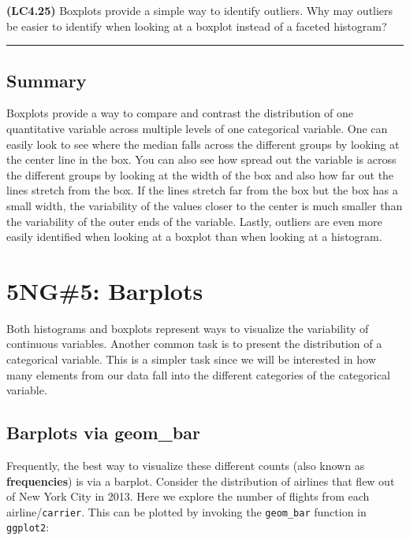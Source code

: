 \documentclass[]{tufte-book}
\let\oldrule=\rule
\renewcommand{\rule}[1]{\oldrule{\linewidth}}
\begin{document}
\textbf{(LC4.25)} Boxplots provide a simple way to identify outliers.
Why may outliers be easier to identify when looking at a boxplot instead
of a faceted histogram?

\begin{center}\rule{0.5\linewidth}{\linethickness}\end{center}

\subsection{Summary}\label{summary-3}

Boxplots provide a way to compare and contrast the distribution of one
quantitative variable across multiple levels of one categorical
variable. One can easily look to see where the median falls across the
different groups by looking at the center line in the box. You can also
see how spread out the variable is across the different groups by
looking at the width of the box and also how far out the lines stretch
from the box. If the lines stretch far from the box but the box has a
small width, the variability of the values closer to the center is much
smaller than the variability of the outer ends of the variable. Lastly,
outliers are even more easily identified when looking at a boxplot than
when looking at a histogram.

\section{5NG\#5: Barplots}\label{geombar}

Both histograms and boxplots represent ways to visualize the variability
of continuous variables. Another common task is to present the
distribution of a categorical variable. This is a simpler task since we
will be interested in how many elements from our data fall into the
different categories of the categorical variable.

\subsection{Barplots via geom\_bar}\label{barplots-via-geom_bar}

Frequently, the best way to visualize these different counts (also known
as \textbf{frequencies}) is via a barplot. Consider the distribution of
airlines that flew out of New York City in 2013. Here we explore the
number of flights from each airline/\texttt{carrier}. This can be
plotted by invoking the \texttt{geom\_bar} function in \texttt{ggplot2}:
\end{document}
